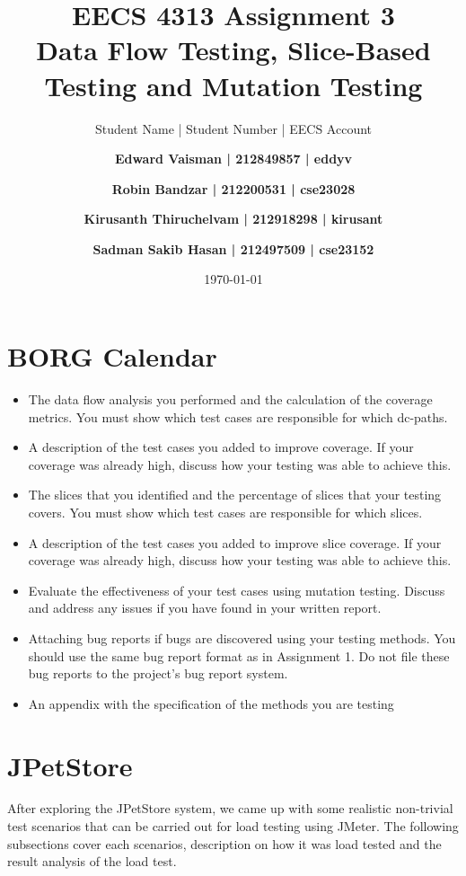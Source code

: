 \documentclass[fontsize=12pt,paper=letter,twoside]{scrartcl}
\author{Student Name | Student Number | EECS Account
\and \textbf{Edward Vaisman | 212849857 | eddyv}
\and \textbf{Robin Bandzar | 212200531 | cse23028}
\and \textbf{Kirusanth Thiruchelvam | 212918298 | kirusant}
\and \textbf{Sadman Sakib Hasan | 212497509 | cse23152}
}
\date{\today} %
\begin{document}
\title{EECS 4313 Assignment 3 \\Data Flow Testing, Slice-Based Testing and Mutation Testing}
\maketitle

\newpage

\tableofcontents
\listoffigures

\newpage


\section{BORG Calendar}

\begin{itemize}
\item The data flow analysis you performed and the calculation of the coverage metrics. You must
show which test cases are responsible for which dc-paths.
\item A description of the test cases you added to improve coverage. If your coverage was already high,
discuss how your testing was able to achieve this.
\item The slices that you identified and the percentage of slices that your testing covers. You must
show which test cases are responsible for which slices.
\item A description of the test cases you added to improve slice coverage. If your coverage was
already high, discuss how your testing was able to achieve this.
\item Evaluate the effectiveness of your test cases using mutation testing. Discuss and address any
issues if you have found in your written report.
\item Attaching bug reports if bugs are discovered using your testing methods. You should use the
same bug report format as in Assignment 1. Do not file these bug reports to the project’s bug
report system.
\item An appendix with the specification of the methods you are testing
\end{itemize}

\newpage
\section{JPetStore}

After exploring the JPetStore system, we came up with some realistic non-trivial test scenarios that can be carried out for load testing using JMeter. The following subsections cover each scenarios, description on how it was load tested and the result analysis of the load test.
\end{document}
